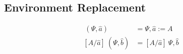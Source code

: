 \documentclass{article}
\begin{document}
\subsection{Environment Replacement}

\begin{align*}
[A/\hat{a}] ~(\Psi , \hat{a}) &= \Psi, \hat{a}:=A\\
[A/\hat{a}]~(\Psi, \hat{b}) &= [A/\hat{a}]~\Psi , \hat{b}\\
\end{align*}
\end{document}

